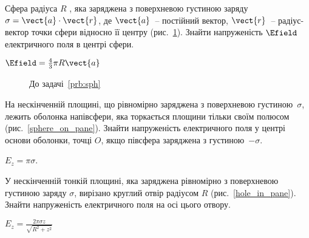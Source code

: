 \begin{problem}\label{prb:sph}
Сфера радіуса $R$ , яка заряджена з поверхневою густиною заряду $\sigma = \vect{a}\cdot\vect{r}$, де $\vect{a}$~-- постійний вектор, $\vect{r}$~-- радіус-вектор точки сфери відносно її центру (рис.~\ref{sph}). Знайти напруженість $\Efield$ електричного поля в центрі сфери.
\begin{solution}
	$\Efield = \frac43 \pi R \vect{a}$
\end{solution}
\end{problem}
\begin{figure}[h!]\centering
	\caption{До задачі~\ref{prb:sph}}
	\label{sph}
\end{figure}

\begin{problem}\label{prb:sphere_on_pane}
На нескінченній площині, що рівномірно заряджена з поверхневою густиною~$\sigma$, лежить оболонка напівсфери, яка торкається площини тільки своїм полюсом (рис.~\ref{sphere_on_pane}). Знайти напруженість електричного поля у центрі основи оболонки, точці $O$, якщо півсфера заряджена з густиною~$-\sigma$.
\begin{solution}
	$E_z = \pi\sigma$.
\end{solution}
\end{problem}

\begin{problem}\label{prb:hole_in_pane}
У нескінченній тонкій площині, яка заряджена рівномірно з поверхневою густиною заряду $\sigma$, вирізано круглий отвір радіусом $R$ (рис.~\ref{hole_in_pane}). Знайти напруженість електричного поля на осі цього отвору.
\begin{solution}
	$E_z = \frac{2\pi\sigma z}{\sqrt{R^2 + z^2}}$
\end{solution}
\end{problem}

